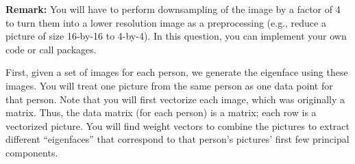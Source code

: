 \documentclass[twoside,10pt]{article}
\begin{document}
\vspace{.1in}
\noindent
{\bf Remark:} You will have to perform downsampling of the image by a factor of 4 to turn them into a lower resolution image as a preprocessing (e.g., reduce a picture of size 16-by-16 to 4-by-4). In this question, you can implement your own code or call packages. 

First, given a set of images for each person, we generate the eigenface using these images. You will treat one picture from the same person as one data point for that person. Note that you will first vectorize each image, which was originally a matrix. Thus, the data matrix (for each person) is a matrix; each row is a vectorized picture. You will find weight vectors to combine the pictures to extract different ``eigenfaces'' that correspond to that person's pictures' first few principal components. 
\end{document}
